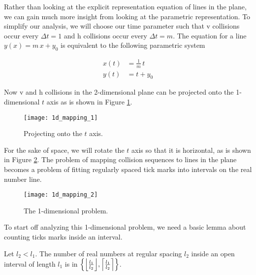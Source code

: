 
Rather than looking at the explicit representation equation of lines in the plane, we can gain much more insight from looking at the parametric representation. To simplify our analysis, we will choose our time parameter such that v collisions occur every $\Delta t = 1$ and h collisions occur every $\Delta t = m$. The equation for a line $y(x) = m \, x + y_0$ is equivalent to the following parametric system

\begin{align}\label{eq:parametric-line}
	x(t)& = \frac{1}{m} \, t\\
	y(t)& = t + y_0
\end{align}

Now v and h collisions in the 2-dimensional plane can be projected onto the 1-dimensional $t$ axis as is shown in Figure \ref{fig:1d-projection}. 

\begin{figure}[H]
  \begin{center}
    \texttt{[image: 1d\_mapping\_1]}
  \end{center}
  \vspace{-.2in} %
  \caption{\label{fig:1d-projection} Projecting onto the $t$ axis.}
\end{figure}

For the sake of space, we will rotate the $t$ axis so that it is horizontal, as is shown in Figure \ref{fig:1d-problem}. The problem of mapping collision sequences to lines in the plane becomes a problem of fitting regularly spaced tick marks into intervals on the real number line.

\begin{figure}[H]
  \begin{center}
    \texttt{[image: 1d\_mapping\_2]}
  \end{center}
  \vspace{-.2in} %
  \caption{\label{fig:1d-problem} The 1-dimensional problem.}
\end{figure}


To start off analyzing this 1-dimensional problem, we need a basic lemma about counting ticks marks inside an interval.

\begin{lemma}\label{lem:interval-ticks}
	Let $l_2 < l_1$. The number of real numbers at regular spacing $l_2$ inside an open interval of length $l_1$ is in $\cbracket{\floor{\frac{l_1}{l_2}}, \ceil{\frac{l_1}{l_2}}}$.
\end{lemma}

